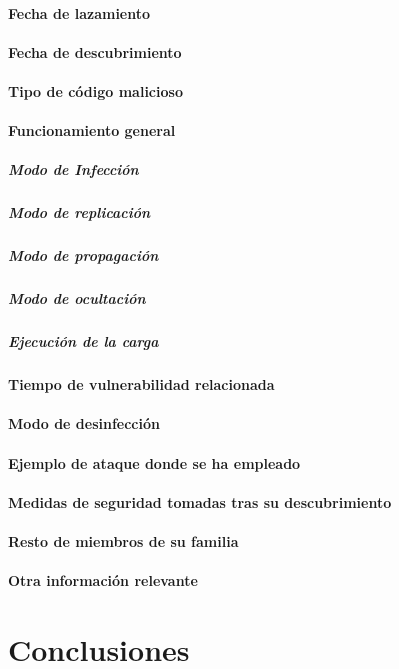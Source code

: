 \documentclass[11pt,a4paper]{article}
\begin{document}
\paragraph{Fecha de lazamiento}

\paragraph{Fecha de descubrimiento}

\paragraph{Tipo de código malicioso}

\paragraph{Funcionamiento general}

\subparagraph{Modo de Infección}

\subparagraph{Modo de replicación}

\subparagraph{Modo de propagación}

\subparagraph{Modo de ocultación}

\subparagraph{Ejecución de la carga}

\paragraph{Tiempo de vulnerabilidad relacionada}

\paragraph{Modo de desinfección}

\paragraph{Ejemplo de ataque donde se ha empleado}

\paragraph{Medidas de seguridad tomadas tras su descubrimiento}

\paragraph{Resto de miembros de su familia}

\paragraph{Otra información relevante}

\section{Conclusiones}
\label{sec:conclusiones}
\end{document}
